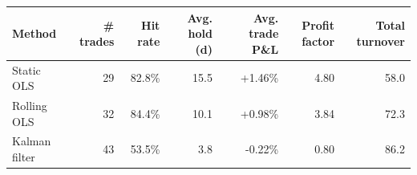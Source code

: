 \begin{tabular}{lrrrrrr}
\toprule
Method & \# trades & Hit rate & Avg. hold (d) & Avg. trade P\&L & Profit factor & Total turnover\\
\midrule
Static OLS & 29 & 82.8\% & 15.5 & +1.46\% & 4.80 & 58.0\\
Rolling OLS & 32 & 84.4\% & 10.1 & +0.98\% & 3.84 & 72.3\\
Kalman filter & 43 & 53.5\% & 3.8 & -0.22\% & 0.80 & 86.2\\
\bottomrule
\end{tabular}
